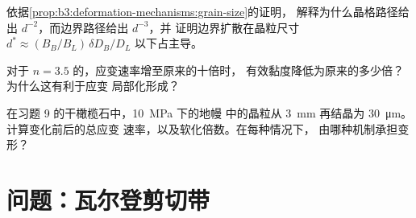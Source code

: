 \begin{exercise}[$\star\star\star$]\label{exo:b3:deformation-mechanisms:10}
依据\cref{prop:b3:deformation-mechanisms:grain-size}的证明，
解释为什么晶格路径给出 $d^{-2}$，而边界路径给出 $d^{-3}$，并
证明边界扩散在晶粒尺寸 $d^* \approx
(B_B/B_L)\,\delta D_B/D_L$ 以下占主导。
\end{exercise}

\begin{exercise}[$\star\star\star$]\label{exo:b3:deformation-mechanisms:11}
对于 $n = 3.5$ 的，应变速率增至原来的十倍时，
有效黏度降低为原来的多少倍？为什么这有利于应变
局部化形成？
\end{exercise}

\begin{exercise}[$\star\star\star$]\label{exo:b3:deformation-mechanisms:12}
在习题 9 的干橄榄石中，\qty{10}{MPa} 下的地幔
中的晶粒从 \qty{3}{mm} 再结晶为 \qty{30}{\micro m}。计算变化前后的总应变
速率，以及软化倍数。在每种情况下，
由哪种机制承担变形？
\end{exercise}

\section{问题：瓦尔登剪切带}

